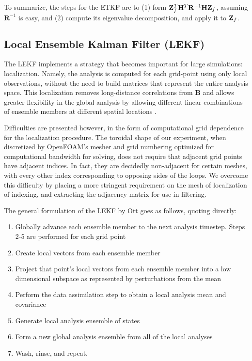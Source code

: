 \documentclass[12pt]{report}
\begin{document}
To summarize, the steps for the ETKF are to (1) form $\mathbf{Z}_f^T\mathbf{H}^T\mathbf{R}^{-1}\mathbf{H}\mathbf{Z}_f$, assuming $\mathbf{R}^{-1}$ is easy, and (2) compute its eigenvalue decomposition, and apply it to $\mathbf{Z}_f$.

\subsection{Local Ensemble Kalman Filter (LEKF)}

The LEKF implements a strategy that becomes important for large simulations: localization.
Namely, the analysis is computed for each grid-point using only local observations, without the need to build matrices that represent the entire analysis space.
This localization removes long-distance correlations from $\mathbf{B}$ and allows greater flexibility in the global analysis by allowing different linear combinations of ensemble members at different spatial locations .

Difficulties are presented however, in the form of computational grid dependence for the localization procedure.
The toroidal shape of our experiment, when discretized by OpenFOAM's mesher and grid numbering optimized for computational bandwidth for solving, does not require that adjacent grid points have adjacent indices.
In fact, they are decidedly non-adjacent for certain meshes, with every other index corresponding to opposing sides of the loops.
We overcome this difficulty by placing a more stringent requirement on the mesh of localization of indexing, and extracting the adjacency matrix for use in filtering.

The general formulation of the LEKF by Ott  goes as follows, quoting directly:
\begin{enumerate}
\item Globally advance each ensemble member to the next analysis timestep. Steps 2-5 are performed for each grid point
\item Create local vectors from each ensemble member
\item Project that point's local vectors from each ensemble member into a low dimensional subspace as represented by perturbations from the mean
\item Perform the data assimilation step to obtain a local analysis mean and covariance
\item Generate local analysis ensemble of states
\item Form a new global analysis ensemble from all of the local analyses
\item Wash, rinse, and repeat.
\end{enumerate}
\end{document}
